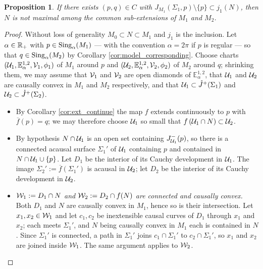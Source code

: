 \documentclass[a4paper,twoside]{article}
\newcommand{\mass}[1]{\mathbb{E}^{1,2}_{#1}}
\newtheorem{prop}[lem]{Proposition}
\begin{document}
\begin{prop}\label{prop:Cauchy_non_max}
If there exists $(p,q)\in C$ with $J_{M_1}(\Sigma_1,p)\setminus\{p\}\subset j_1(N)$, then $N$ is not
maximal among the common sub-extensions of $M_1$ and $M_2$.
\end{prop}
\begin{proof}
Without loss of generality $M_0\subset N\subset M_1$ and $j_1$ is the inclusion. Let $\alpha\in
\mathbb R_+$ with $p\in \mathrm{Sing}_\alpha(M_1)$ --- with the convention $\alpha=2\pi$ if $p$ is regular --- so
that $q\in \mathrm{Sing}_\alpha(M_2)$ by Corollary \ref{cor:model_corresponding}. Choose charts
$(\U_1,\mass{\alpha},\V_1,\phi_1)$ of $M_1$ around $p$ and $(\U_2,\mass{\alpha},\V_2,\phi_2)$ of
$M_2$ around $q$; shrinking them, we may assume that $\mathcal V_1$ and $\mathcal V_2$ are open diamonds of
$\mass{\alpha}$, that $\mathcal{U}_1$ and $\mathcal{U}_2$ are causally convex in $M_1$ and $M_2$ respectively, and
that $\U_1\subset \ring J^+(\Sigma_1)$ and $\U_2\subset \ring J^+(\Sigma_2)$.

\begin{itemize}
\item By Corollary \ref{cor:ext_continue} the map $f$ extends continuously to $p$ with $\overline
f(p)=q$; we may therefore choose $\mathcal{U}_1$ so small that $f\left(\mathcal{U}_1\cap N\right)\subset \mathcal{U}_2$.

\item By hypothesis $N\cap \mathcal{U}_1$ is an open set containing $J^-_{\mathcal{U}_1}(p)$, so there is a connected
acausal surface $\Sigma_1'$ of $\mathcal{U}_1$ containing $p$ and contained in $N\cap \mathcal{U}_1\cup\{p\}$. Let
$D_1$ be the interior of its Cauchy development in $\mathcal{U}_1$. The image $\Sigma_2':=\overline
f(\Sigma_1')$ is acausal in $\mathcal{U}_2$; let $D_2$ be the interior of its Cauchy development in $\mathcal{U}_2$.

\item \emph{$\mathcal W_1:=D_1\cap N$ and $\mathcal W_2:=D_2\cap f(N)$ are connected and causally convex.} Both
$D_1$ and $N$ are causally convex in $M_1$, hence so is their intersection. Let $x_1,x_2\in \mathcal W_1$ and
let $c_1,c_2$ be inextensible causal curves of $D_1$ through $x_1$ and $x_2$; each meets
$\Sigma_1'$, and $N$ being causally convex in $M_1$ each is contained in $N$. Since $\Sigma_1'$ is
connected, a path in $\Sigma_1'$ joins $c_1\cap \Sigma_1'$ to $c_2\cap \Sigma_1'$, so $x_1$ and
$x_2$ are joined inside $\mathcal W_1$. The same argument applies to $\mathcal W_2$.


\end{itemize}
\end{proof}
\end{document}
